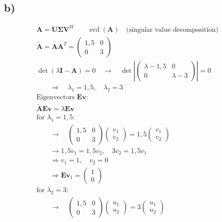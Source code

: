 \documentclass[fleqn]{article}
\DeclareMathOperator{\svd}{svd}
\begin{document}
\subsection*{b)}
\begin{align*}
	&\mathbf{A=U\Sigma V}^{H}\qquad\svd\left(\mathbf{A}\right)\quad\text{(singular value decomposition)}& \\
	&\tilde{\mathbf{A}}=\mathbf{AA}^{T}=
	\begin{pmatrix}
	1,5 & 0 \\
	0 & 3
	\end{pmatrix}& \\
	&\det\left(\lambda\mathbf{I-A}\right)=0\quad\rightarrow\quad\det\left|
	\begin{pmatrix}
	\lambda-1,5 & 0 \\
	0 & \lambda-3
	\end{pmatrix}\right|=0& \\
	&\qquad\Rightarrow\quad\lambda_{1}=1,5,\quad\lambda_{2}=3& \\
	&\text{Eigenvectors $\mathbf{Ev}$:}& \\
	&\mathbf{\tilde{A}Ev}=\lambda\mathbf{Ev}& \\
	&\text{for $\lambda_{1}=1,5$:}& \\
	&\qquad\rightarrow\quad
	\begin{pmatrix}
	1,5 & 0 \\
	0 & 3
	\end{pmatrix}\begin{pmatrix}v_{1}\\v_{2}\end{pmatrix}=1,5\begin{pmatrix}v_{1}\\v_{2}\end{pmatrix}& \\
	&\qquad\rightarrow 1,5v_{1}=1,5v_{2},\quad 3v_{2}=1,5v_{1}& \\
	&\qquad\Rightarrow v_{1}=1,\quad v_{2}=0& \\
	&\qquad\Rightarrow\mathbf{Ev}_{1}=\begin{pmatrix}1\\0\end{pmatrix}& \\
	&\text{for $\lambda_{2}=3$:}& \\
	&\qquad\rightarrow\quad
	\begin{pmatrix}
	1,5 & 0 \\
	0 & 3
	\end{pmatrix}\begin{pmatrix}u_{1}\\u_{2}\end{pmatrix}=3\begin{pmatrix}u_{1}\\u_{2}\end{pmatrix}& \\

\end{align*}
\end{document}
